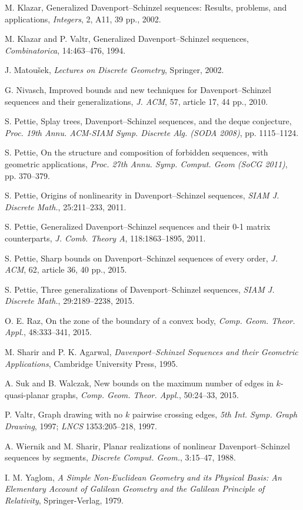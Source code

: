 \documentclass[11pt]{article}
\theoremstyle{definition}
\theoremstyle{remark}
\begin{document}
\begin{thebibliography}{99}
M. Klazar, Generalized Davenport--Schinzel sequences: Results, problems, and applications, \emph{Integers}, 2, A11, 39 pp., 2002.

M. Klazar and P. Valtr, Generalized Davenport--Schinzel sequences, \emph{Combinatorica}, 14:463--476, 1994.

J. Matou\v sek, \emph{Lectures on Discrete Geometry}, Springer, 2002.

G. Nivasch, Improved bounds and new techniques for Davenport--Schinzel sequences and their generalizations, \emph{J. ACM}, 57, article 17, 44 pp., 2010.

S. Pettie, Splay trees, Davenport--Schinzel sequences, and the deque conjecture, \emph{Proc. 19th Annu. ACM-SIAM Symp. Discrete Alg. (SODA 2008)}, pp. 1115--1124.

S. Pettie, On the structure and composition of forbidden sequences, with geometric applications, \emph{Proc. 27th Annu. Symp. Comput. Geom (SoCG 2011)}, pp. 370--379.

S. Pettie, Origins of nonlinearity in Davenport--Schinzel sequences, \emph{SIAM J. Discrete Math.}, 25:211--233, 2011.

S. Pettie, Generalized Davenport--Schinzel sequences and their 0-1 matrix counterparts, \emph{J. Comb. Theory A}, 118:1863--1895, 2011.

S. Pettie, Sharp bounds on Davenport--Schinzel sequences of every order, \emph{J. ACM}, 62, article 36, 40 pp., 2015.

S. Pettie, Three generalizations of Davenport--Schinzel sequences, \emph{SIAM J. Discrete Math.}, 29:2189--2238, 2015.

O. E. Raz, On the zone of the boundary of a convex body, \emph{Comp. Geom. Theor. Appl.}, 48:333--341, 2015.

M. Sharir and P. K. Agarwal, \emph{Davenport--Schinzel Sequences and their Geometric Applications}, Cambridge University Press, 1995.

A. Suk and B. Walczak, New bounds on the maximum number of edges in $k$-quasi-planar graphs, \emph{Comp. Geom. Theor. Appl.}, 50:24--33, 2015.

P. Valtr, Graph drawing with no $k$ pairwise crossing edges, \emph{5th Int. Symp. Graph Drawing}, 1997; \emph{LNCS} 1353:205--218, 1997.

A. Wiernik and M. Sharir, Planar realizations of nonlinear Davenport--Schinzel sequences by segments, \emph{Discrete Comput. Geom.}, 3:15--47, 1988.

I. M. Yaglom, \emph{A Simple Non-Euclidean Geometry and its Physical Basis: An Elementary Account of Galilean Geometry and the Galilean Principle of Relativity}, Springer-Verlag, 1979.
\end{thebibliography}
\end{document}
